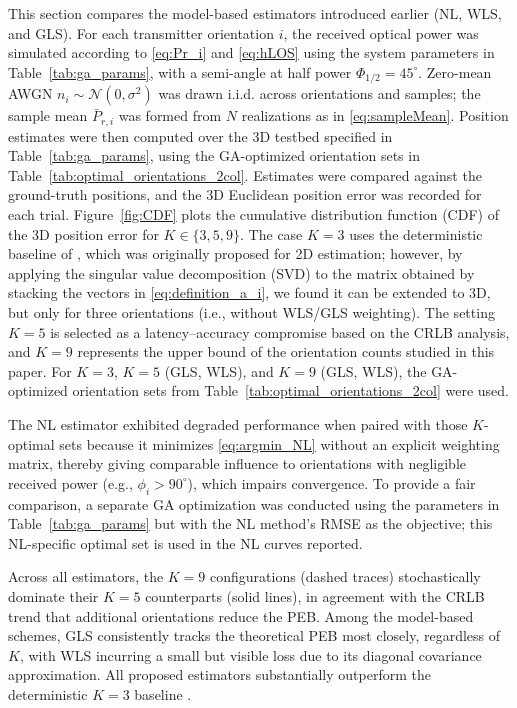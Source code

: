 \documentclass[journal]{IEEEtran}
\newcommand{\deleted}[1]{{\color{red}#1}}
\begin{document}
\deleted{This section compares the model-based estimators introduced earlier (NL, WLS, and GLS). For each transmitter orientation $i$, the received optical power was simulated according to \eqref{eq:Pr_i} and \eqref{eq:hLOS} using the system parameters in Table~\ref{tab:ga_params}, with a semi-angle at half power $\Phi_{1/2}=45^\circ$. Zero-mean AWGN $n_i\!\sim\!\mathcal{N}(0,\sigma^2)$ was drawn i.i.d. across orientations and samples; the sample mean $\bar P_{r,i}$ was formed from $N$ realizations as in \eqref{eq:sampleMean}. Position estimates were then computed over the 3D testbed specified in Table~\ref{tab:ga_params}, using the GA-optimized orientation sets in Table~\ref{tab:optimal_orientations_2col}. Estimates were compared against the ground-truth positions, and the 3D Euclidean position error was recorded for each trial. Figure~\ref{fig:CDF} plots the cumulative distribution function (CDF) of the 3D position error for $K\in\{3,5,9\}$. The case $K=3$ uses the deterministic baseline of \cite{Chassagne2025}, which was originally proposed for 2D estimation; however, by applying the singular value decomposition (SVD) to the matrix obtained by stacking the vectors in \eqref{eq:definition_a_i}, we found it can be extended to 3D, but only for three orientations (i.e., without WLS/GLS weighting).
The setting $K=5$ is selected as a latency--accuracy compromise based on the CRLB analysis, and $K=9$ represents the upper bound of the orientation counts studied in this paper. For $K=3$, $K=5$ (GLS, WLS), and $K=9$ (GLS, WLS), the GA-optimized orientation sets from Table~\ref{tab:optimal_orientations_2col} were used.

The NL estimator exhibited degraded performance when paired with those $K$-optimal sets because it minimizes \eqref{eq:argmin_NL} without an explicit weighting matrix, thereby giving comparable influence to orientations with negligible received power (e.g., $\phi_i>90^\circ$), which impairs convergence. To provide a fair comparison, a separate GA optimization was conducted using the parameters in Table~\ref{tab:ga_params} but with the NL method's RMSE as the objective; this NL-specific optimal set is used in the NL curves reported.

Across all estimators, the $K=9$ configurations (dashed traces) stochastically dominate their $K=5$ counterparts (solid lines), in agreement with the CRLB trend that additional orientations reduce the PEB. Among the model-based schemes, GLS consistently tracks the theoretical PEB most closely, regardless of $K$, with WLS incurring a small but visible loss due to its diagonal covariance approximation. All proposed estimators substantially outperform the deterministic $K=3$ baseline \cite{Chassagne2025}.}
\end{document}
